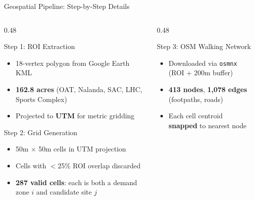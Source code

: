 \documentclass[aspectratio=169]{beamer}
\begin{document}
\begin{frame}{Geospatial Pipeline: Step-by-Step Details}
    \small
    \begin{columns}[T]
        \begin{column}{0.48\textwidth}
            \begin{block}{Step 1: ROI Extraction}
                \begin{itemize}\setlength\itemsep{0pt}
                    \item 18-vertex polygon from Google Earth KML
                    \item \textbf{162.8 acres} (OAT, Nalanda, SAC, LHC, Sports Complex)
                    \item Projected to \textbf{UTM} for metric gridding
                \end{itemize}
            \end{block}

            \begin{exampleblock}{Step 2: Grid Generation}
                \begin{itemize}\setlength\itemsep{0pt}
                    \item 50m $\times$ 50m cells in UTM projection
                    \item Cells with $<$25\% ROI overlap discarded
                    \item \textbf{287 valid cells}: each is both a demand zone $i$ and candidate site $j$
                \end{itemize}
            \end{exampleblock}
        \end{column}
        \begin{column}{0.48\textwidth}
            \begin{alertblock}{Step 3: OSM Walking Network}
                \begin{itemize}\setlength\itemsep{0pt}
                    \item Downloaded via \texttt{osmnx} (ROI + 200m buffer)
                    \item \textbf{413 nodes}, \textbf{1{,}078 edges} (footpaths, roads)
                    \item Each cell centroid \textbf{snapped} to nearest node
                \end{itemize}
            \end{alertblock}


\end{column}
\end{columns}
\end{frame}
\end{document}
